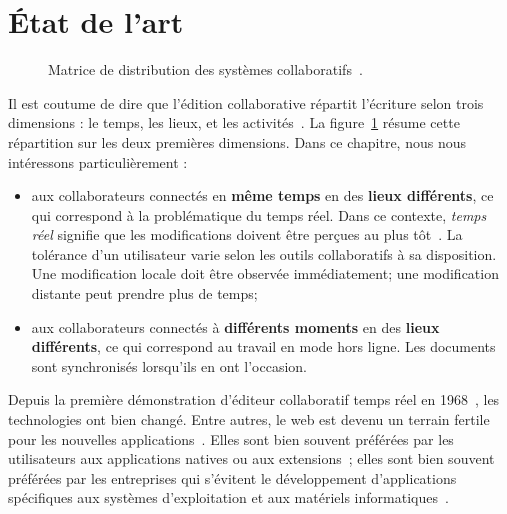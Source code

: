 
\section{État de l'art}
\label{editor:sec:stateoftheart}

\begin{figure}
  \begin{center}
    
    \caption[Matrice de distribution des systèmes collaboratifs] {
      \label{editor:fig:groupware} Matrice de distribution des systèmes
      collaboratifs~\cite{johansen1988groupware}.}
  \end{center}
\end{figure}


Il est coutume de dire que l'édition collaborative répartit l'écriture selon
trois dimensions : le temps, les lieux, et les
activités~\cite{desanctis1987foundation, grudin1994computersupported,
  johansen1988groupware}.  La figure~\ref{editor:fig:groupware} résume cette
répartition sur les deux premières dimensions. Dans ce chapitre, nous nous
intéressons particulièrement : 
\begin{itemize}
\item aux collaborateurs connectés en \textbf{même temps} en des \textbf{lieux
    différents}, ce qui correspond à la problématique du temps réel. Dans ce
  contexte, \emph{temps réel} signifie que les modifications doivent être
  perçues au plus tôt~\cite{ellis1989concurrency}. La tolérance d'un utilisateur
  varie selon les outils collaboratifs à sa disposition. Une modification locale
  doit être observée immédiatement; une modification distante peut prendre plus
  de temps;
\item aux collaborateurs connectés à \textbf{différents moments} en des
  \textbf{lieux différents}, ce qui correspond au travail en mode hors
  ligne. Les documents sont synchronisés lorsqu'ils en ont l'occasion.
\end{itemize}

Depuis la première démonstration d'éditeur collaboratif temps réel en
1968~\cite{engelbart1968research}, les technologies ont bien changé. Entre
autres, le web est devenu un terrain fertile pour les nouvelles
applications~\cite{lautamaki2013development}. Elles sont bien souvent préférées
par les utilisateurs aux applications natives ou aux
extensions~\cite{mogan2010impact}; elles sont bien souvent préférées par les
entreprises qui s'évitent le développement d'applications spécifiques aux
systèmes d'exploitation et aux matériels informatiques~\cite{mogan2010impact}.

